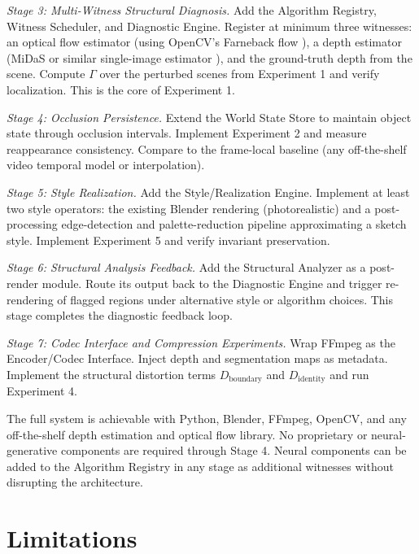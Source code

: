 \documentclass[11pt,a4paper]{article}
\theoremstyle{plain}
\theoremstyle{definition}
\theoremstyle{remark}
\begin{document}
\textit{Stage 3: Multi-Witness Structural Diagnosis.} Add the Algorithm Registry, Witness Scheduler, and Diagnostic Engine. Register at minimum three witnesses: an optical flow estimator (using OpenCV's Farneback flow \cite{farneback2003}), a depth estimator (MiDaS or similar single-image estimator \cite{ranftl2020}), and the ground-truth depth from the scene. Compute $\Gamma$ over the perturbed scenes from Experiment 1 and verify localization. This is the core of Experiment 1.

\textit{Stage 4: Occlusion Persistence.} Extend the World State Store to maintain object state through occlusion intervals. Implement Experiment 2 and measure reappearance consistency. Compare to the frame-local baseline (any off-the-shelf video temporal model or interpolation).

\textit{Stage 5: Style Realization.} Add the Style/Realization Engine. Implement at least two style operators: the existing Blender rendering (photorealistic) and a post-processing edge-detection and palette-reduction pipeline approximating a sketch style. Implement Experiment 5 and verify invariant preservation.

\textit{Stage 6: Structural Analysis Feedback.} Add the Structural Analyzer as a post-render module. Route its output back to the Diagnostic Engine and trigger re-rendering of flagged regions under alternative style or algorithm choices. This stage completes the diagnostic feedback loop.

\textit{Stage 7: Codec Interface and Compression Experiments.} Wrap FFmpeg \cite{ffmpeg2024} as the Encoder/Codec Interface. Inject depth and segmentation maps as metadata. Implement the structural distortion terms $D_{\mathrm{boundary}}$ and $D_{\mathrm{identity}}$ and run Experiment 4.

The full system is achievable with Python, Blender, FFmpeg, OpenCV, and any off-the-shelf depth estimation and optical flow library. No proprietary or neural-generative components are required through Stage 4. Neural components can be added to the Algorithm Registry in any stage as additional witnesses without disrupting the architecture.

\section{Limitations}
\label{sec:limitations}
\end{document}

